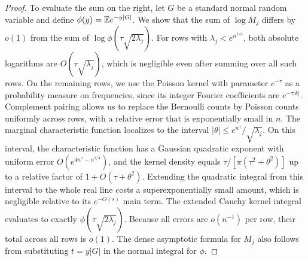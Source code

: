 \begin{proof}
To evaluate the sum on the right, let \(G\) be a standard normal random
variable and define \(\phi(y)=\mathbb E e^{-y|G|}\). We show that the sum of
\(\log M_j\) differs by \(o(1)\) from the sum of
\(\log\phi(\tau\sqrt{2\lambda_j})\). For rows with
\(\lambda_j<e^{n^{1/4}}\), both absolute logarithms are
\(O(\tau\sqrt{\lambda_j})\), which is negligible even after summing over all
such rows. On the remaining rows, we use the Poisson kernel with parameter
\(e^{-\tau}\) as a probability measure on frequencies, since its integer
Fourier coefficients are \(e^{-\tau|k|}\). Complement pairing allows us to
replace the Bernoulli counts by Poisson counts uniformly across rows, with a
relative error that is exponentially small in \(n\). The marginal
characteristic function localizes to the interval
\(|\theta|\le e^{n^\gamma}/\sqrt{\lambda_j}\). On this interval, the
characteristic function has a Gaussian quadratic exponent with uniform error
\(O(e^{4n^\gamma-n^{1/4}})\), and the kernel density equals
\(\tau/[\pi(\tau^2+\theta^2)]\) up to a relative factor of
\(1+O(\tau+\theta^2)\). Extending the quadratic integral from this interval to
the whole real line costs a superexponentially small amount, which is
negligible relative to its \(e^{-O(s)}\) main term. The extended Cauchy kernel
integral evaluates to exactly \(\phi(\tau\sqrt{2\lambda_j})\). Because all
errors are \(o(n^{-1})\) per row, their total across all rows is \(o(1)\).
The dense asymptotic formula for \(M_j\) also follows from substituting
\(t=y|G|\) in the normal integral for \(\phi\).


\end{proof}
